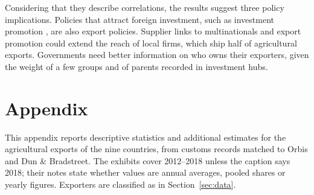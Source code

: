 Considering that they describe correlations, the results suggest three policy implications. Policies that
attract foreign investment, such as investment promotion \citep{harding2011,volpe2021,carballo2026}, are also export policies. Supplier links to multinationals
\citep{alfarourena2022,carballo2021} and export promotion \citep{volpe2008} could extend the reach of local firms, which ship half of agricultural exports. Governments need
better information on who owns their exporters, given the weight of a few groups and of parents recorded in investment hubs.

\clearpage



\clearpage
\appendix
\setcounter{figure}{0}
\setcounter{table}{0}
\renewcommand{\thesubsection}{A.\arabic{subsection}}
\section*{Appendix}\label{sec:app}

This appendix reports descriptive statistics and additional estimates for the agricultural exports of the nine countries, from customs records matched to Orbis and Dun \& Bradstreet. The exhibits cover 2012--2018 unless the caption says 2018; their notes state whether values are annual averages, pooled shares or yearly figures. Exporters are classified as in Section~\ref{sec:data}.

